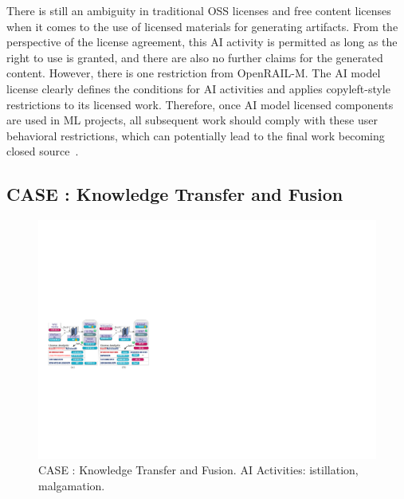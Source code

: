 There is still an ambiguity in traditional OSS licenses and free content licenses when it comes to the use of licensed materials for generating artifacts.
From the perspective of the license agreement, this AI activity is permitted as long as the right to use is granted, and there are also no further claims for the generated content.
However, there is one restriction from OpenRAIL-M. 
The AI model license clearly defines the conditions for AI activities and applies copyleft-style restrictions to its licensed work. 
Therefore, once AI model licensed components are used in ML projects, all subsequent work should comply with these user behavioral restrictions, which can potentially lead to the final work becoming closed source~\cite{greenbaum2016the}.


\subsection{CASE  : Knowledge Transfer and Fusion}


\begin{figure}[h]
    \centering
    \includegraphics[width=\linewidth]{fig/case4.pdf}
    \caption{CASE : Knowledge Transfer and Fusion. AI Activities: istillation, malgamation.}
    \Description{}
    \label{fig:case4}
\end{figure}


